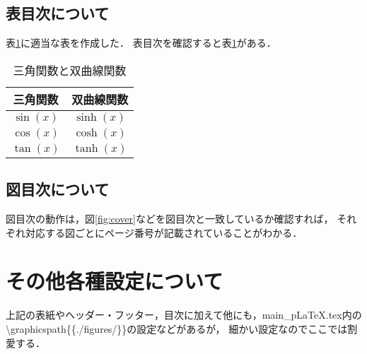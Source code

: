 \subsection{表目次について}
表\ref{tab:triangle}に適当な表を作成した．
表目次を確認すると表\ref{tab:triangle}がある．

\begin{table}[htbp]
  \centering
  \caption{三角関数と双曲線関数}
  \begin{tabular}{cc} \toprule 
    三角関数 & 双曲線関数 \\ \hline
    $\sin(x)$ & $\sinh(x)$ \\
    $\cos(x)$ & $\cosh(x)$ \\
    $\tan(x)$ & $\tanh(x)$ \\ \hline
  \end{tabular}
  \label{tab:triangle}
\end{table}


\subsection{図目次について}
図目次の動作は，図\ref{fig:cover}などを図目次と一致しているか確認すれば，
それぞれ対応する図ごとにページ番号が記載されていることがわかる．


\section{その他各種設定について}
上記の表紙やヘッダー・フッター，目次に加えて他にも，main\_pLaTeX.tex内の
\textbackslash graphicspath\{\{./figures/\}\}の設定などがあるが，
細かい設定なのでここでは割愛する．
